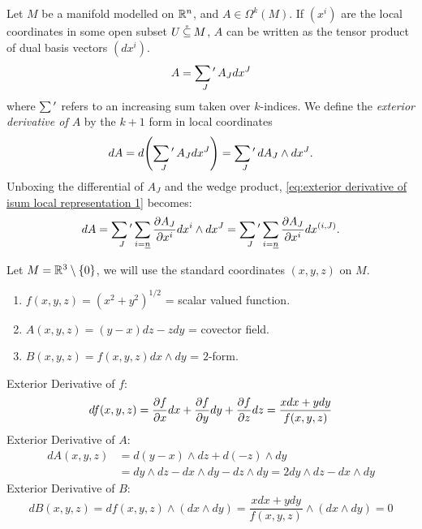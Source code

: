 \documentclass[../main-v2-manifolds.tex]{subfiles}
\begin{document}
\begin{definition}
    Let $M$ be a manifold modelled on ${\mathbb{R}^n}$, and $A\in \Omega^k(M)$. If $(x^i)$ are the local coordinates in some open subset $U\:\mathring{\subseteq}\: M$, $A$ can be written as the tensor product of dual basis vectors $(dx^i)$.
    \begin{equation}
        A = \mathop{\sum\nolimits{'}}_{J}A_J dx^J
        \label{eq:k form isum local representation}
    \end{equation}
    where $\mathop{\sum\nolimits{'}}$ refers to an increasing sum taken over $k$-indices. We define the \emph{exterior derivative of $A$} by the $k+1$ form in local coordinates
    \begin{equation}
        dA = d\qty(\mathop{\sum\nolimits{'}}_J A_J dx^J) = \mathop{\sum\nolimits{'}}_J dA_J \wedge dx^J.
        \label{eq:exterior derivative of isum local representation 1}
    \end{equation}
    Unboxing the differential of $A_J$ and the wedge product, \cref{eq:exterior derivative of isum local representation 1} becomes:
    \begin{equation}
        dA = \mathop{\sum\nolimits{'}}_J \sum_{i=\underline{n}}\pdv{A_J}{x^i}dx^i\wedge dx^J = \mathop{\sum\nolimits{'}}_J\sum_{i=\underline{n}} \pdv{A_J}{x^i}dx^{(i,J)}.
        \label{eq:exterior derivative of isum local representation 2}
    \end{equation}
\end{definition}
\begin{example}\label{exmp:exterior derivative}
    Let $M = \mathbb{R}^3\setminus \{0\}$, we will use the standard coordinates $(x,y,z)$ on $M$. 
    \begin{enumerate}
        \item $f(x,y,z) = (x^2 + y^2)^{1/2}$ = scalar valued function.
        \item $A(x,y,z) = (y-x)dz - zdy$ = covector field.
        \item $B(x,y,z) = f(x,y,z)dx\wedge dy$ = $2$-form.
    \end{enumerate}
    Exterior Derivative of $f$:
    \[
        df(x,y,z) = \pdv{f}{x}dx + \pdv{f}{y}dy + \pdv{f}{z}dz = \frac{xdx + ydy}{f(x,y,z)}
    \]
    Exterior Derivative of $A$:
    \begin{align*}
        dA(x,y,z) &= d(y-x)\wedge dz + d(-z)\wedge dy \\[1ex]
        &= dy\wedge dz - dx\wedge dy - dz\wedge dy = 2dy\wedge dz -dx\wedge dy
    \end{align*}
    Exterior Derivative of $B$:
    \[
        dB(x,y,z)= df(x,y,z)\wedge (dx\wedge dy) = \frac{xdx + ydy}{f(x,y,z)}\wedge (dx\wedge dy)=0
    \]
\end{example}
\end{document}
